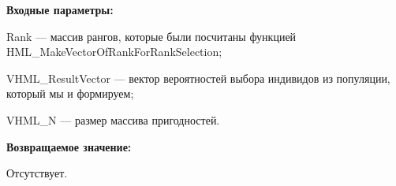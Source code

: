 \textbf{Входные параметры:}  
 
Rank --- массив рангов, которые были посчитаны функцией HML\_MakeVectorOfRankForRankSelection;
 
VHML\_ResultVector --- вектор вероятностей выбора индивидов из популяции, который мы и формируем;
 
VHML\_N --- размер массива пригодностей.

\textbf{Возвращаемое значение:}

 Отсутствует.